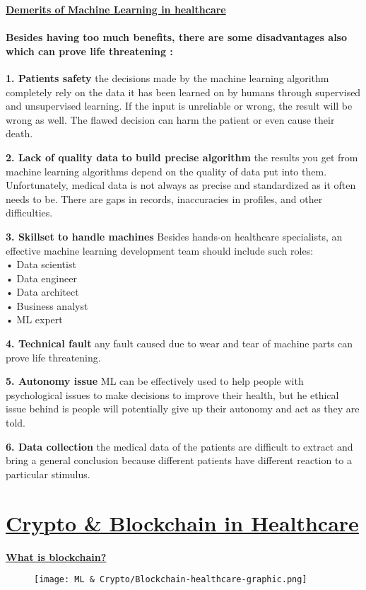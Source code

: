 \documentclass{article}
\begin{document}
    \textbf{\underline{Demerits of Machine Learning in healthcare}}\\
    \paragraph{Besides having too much benefits, there are some disadvantages also which can prove life threatening :} 
    
    \textbf{1. Patients safety }the decisions made by the machine learning algorithm completely rely on the data it has been learned on by humans through supervised and unsupervised learning. If the input is unreliable or wrong, the result will be wrong as well. The flawed decision can harm the patient or even cause their death.
    
    \textbf{2. Lack of quality data to build precise algorithm }the results you get from machine learning algorithms depend on the quality of data put into them. Unfortunately, medical data is not always as precise and standardized as it often needs to be. There are gaps in records, inaccuracies in profiles, and other difficulties.
    
    \textbf{3. Skillset to handle machines }Besides hands-on healthcare specialists, an effective machine learning development team should include such roles:\\
   •	Data scientist\\
   •	Data engineer\\
   •	Data architect\\
   •	Business analyst\\
   •	ML expert
    
    \textbf{4. Technical fault }any fault caused due to wear and tear of machine parts can prove life threatening.
    
    \textbf{5. Autonomy issue }ML can be effectively used to help people with psychological issues to make decisions to improve their health, but he ethical issue behind is people will potentially give up their autonomy and act as they are told.
    
    \textbf{6. Data collection }the medical data of the patients are difficult to extract and bring a general conclusion because different patients have different reaction to a particular stimulus.\\
    
    \section{\Large \textbf{\underline{Crypto \& Blockchain in Healthcare}}}
    \textbf{\underline{What is blockchain?}}
    \begin{figure}[h]
    	\texttt{[image: ML \& Crypto/Blockchain-healthcare-graphic.png]}
    \end{figure}
\end{document}
